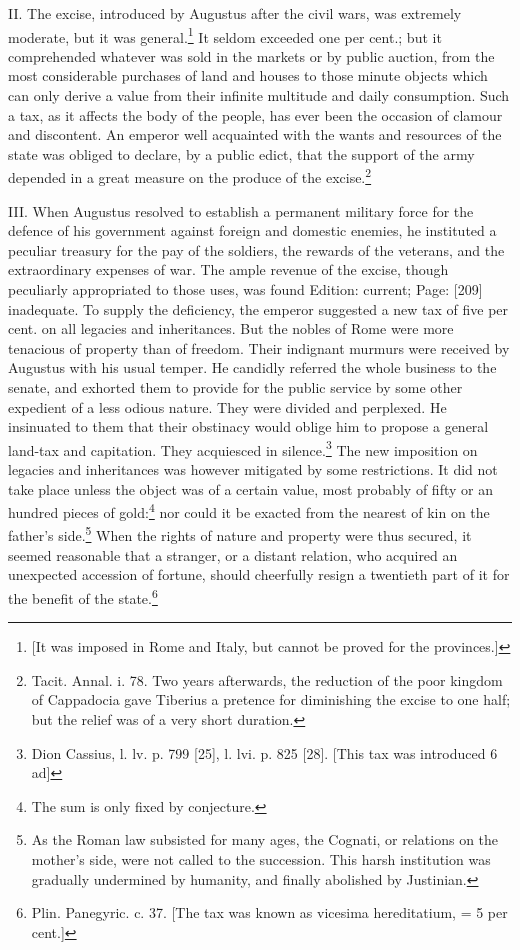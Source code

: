 II. The excise, introduced by Augustus after the civil wars, was extremely moderate, but it was general.\footnote{[It was imposed in Rome and Italy, but cannot be proved for the provinces.]} It seldom exceeded one per cent.; but it comprehended whatever was sold in the markets or by public auction, from the most considerable purchases of land and houses to those minute objects which can only derive a value from their infinite multitude and daily consumption. Such a tax, as it affects the body of the people, has ever been the occasion of clamour and discontent. An emperor well acquainted with the wants and resources of the state was obliged to declare, by a public edict, that the support of the army depended in a great measure on the produce of the excise.\footnote{Tacit. Annal. i. 78. Two years afterwards, the reduction of the poor kingdom of Cappadocia gave Tiberius a pretence for diminishing the excise to one half; but the relief was of a very short duration.}

III. When Augustus resolved to establish a permanent military force for the defence of his government against foreign and domestic enemies, he instituted a peculiar treasury for the pay of the soldiers, the rewards of the veterans, and the extraordinary expenses of war. The ample revenue of the excise, though peculiarly appropriated to those uses, was found Edition: current; Page: [209] inadequate. To supply the deficiency, the emperor suggested a new tax of five per cent. on all legacies and inheritances. But the nobles of Rome were more tenacious of property than of freedom. Their indignant murmurs were received by Augustus with his usual temper. He candidly referred the whole business to the senate, and exhorted them to provide for the public service by some other expedient of a less odious nature. They were divided and perplexed. He insinuated to them that their obstinacy would oblige him to propose a general land-tax and capitation. They acquiesced in silence.\footnote{Dion Cassius, l. lv. p. 799 [25], l. lvi. p. 825 [28]. [This tax was introduced 6 ad]} The new imposition on legacies and inheritances was however mitigated by some restrictions. It did not take place unless the object was of a certain value, most probably of fifty or an hundred pieces of gold:\footnote{The sum is only fixed by conjecture.} nor could it be exacted from the nearest of kin on the father\texthebrew{}’s side.\footnote{As the Roman law subsisted for many ages, the Cognati, or relations on the mother\texthebrew{}’s side, were not called to the succession. This harsh institution was gradually undermined by humanity, and finally abolished by Justinian.} When the rights of nature and property were thus secured, it seemed reasonable that a stranger, or a distant relation, who acquired an unexpected accession of fortune, should cheerfully resign a twentieth part of it for the benefit of the state.\footnote{Plin. Panegyric. c. 37. [The tax was known as vicesima hereditatium, = 5 per cent.]}


